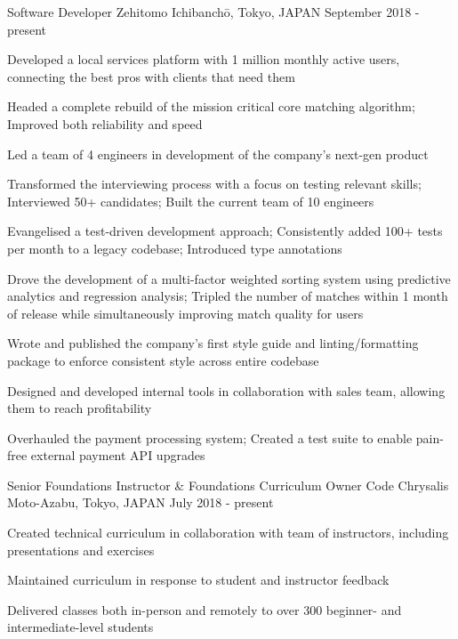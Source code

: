 
\begin{cventries}

  \cventry
  {Software Developer} %
  {Zehitomo} %
  {Ichibanchō, Tokyo, JAPAN} %
  {September 2018 - present} %
  {
    \begin{cvitems} %
      \item {Developed a local services platform with 1 million monthly active users, connecting the best pros with clients that need them}
      \item {Headed a complete rebuild of the mission critical core matching algorithm; Improved both reliability and speed}
      \item {Led a team of 4 engineers in development of the company's next-gen product}
      \item {Transformed the interviewing process with a focus on testing relevant skills; Interviewed 50+ candidates; Built the current team of 10 engineers}
      \item {Evangelised a test-driven development approach; Consistently added 100+ tests per month to a legacy codebase; Introduced type annotations}
      \item {Drove the development of a multi-factor weighted sorting system using predictive analytics and regression analysis; Tripled the number of matches within 1 month of release while simultaneously improving match quality for users}
      \item {Wrote and published the company's first style guide and linting/formatting package to enforce consistent style across entire codebase}
      \item {Designed and developed internal tools in collaboration with sales team, allowing them to reach profitability}
      \item {Overhauled the payment processing system; Created a test suite to enable pain-free external payment API upgrades}
    \end{cvitems}
  }

  \cventry
  {Senior Foundations Instructor \& Foundations Curriculum Owner} %
  {Code Chrysalis} %
  {Moto-Azabu, Tokyo, JAPAN} %
  {July 2018 - present} %
  {
    \begin{cvitems} %
      \item {Created technical curriculum in collaboration with team of instructors, including presentations and exercises}
      \item {Maintained curriculum in response to student and instructor feedback}
      \item {Delivered classes both in-person and remotely to over 300 beginner- and intermediate-level students}
    \end{cvitems}
  }


\end{cventries}
